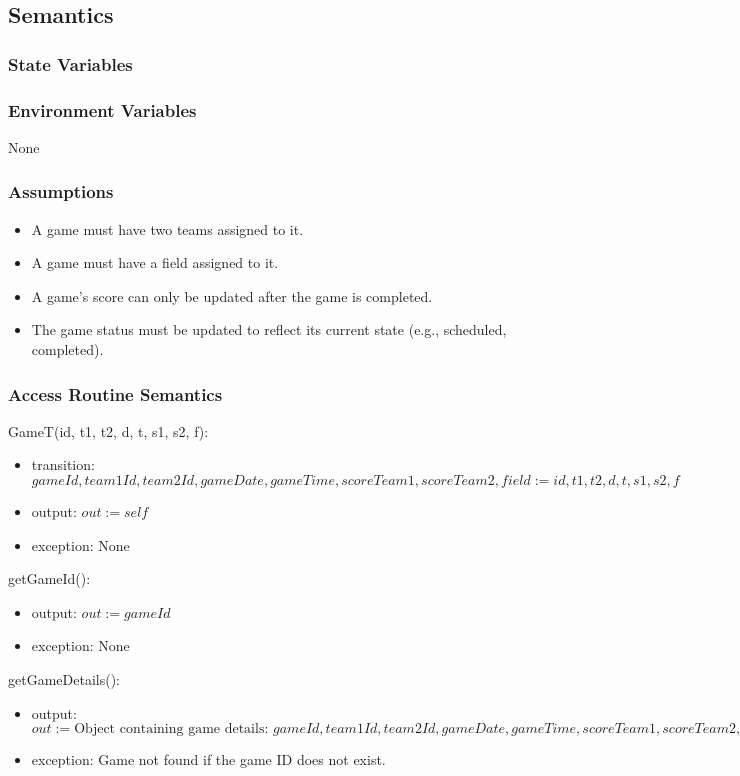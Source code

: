 \documentclass[12pt, titlepage]{article}
\begin{document}
\subsection{Semantics}

\subsubsection{State Variables}

\subsubsection{Environment Variables}
None

\subsubsection{Assumptions}
\begin{itemize}
  \item A game must have two teams assigned to it.
  \item A game must have a field assigned to it.
  \item A game's score can only be updated after the game is completed.
  \item The game status must be updated to reflect its current state (e.g., scheduled, completed).
\end{itemize}

\subsubsection{Access Routine Semantics}

\noindent GameT(id, t1, t2, d, t, s1, s2, f):
\begin{itemize}
\item transition: $gameId, team1Id, team2Id, gameDate, gameTime, scoreTeam1, scoreTeam2, field := id, t1, t2, d, t, s1, s2, f$
\item output: $out := self$
\item exception: None
\end{itemize}

\noindent getGameId():
\begin{itemize}
\item output: $out := gameId$
\item exception: None
\end{itemize}

\noindent getGameDetails():
\begin{itemize}
\item output: $out := \text{Object containing game details: } gameId, team1Id, team2Id, gameDate, gameTime, scoreTeam1, scoreTeam2, status, field$
\item exception: Game not found if the game ID does not exist.
\end{itemize}
\end{document}
